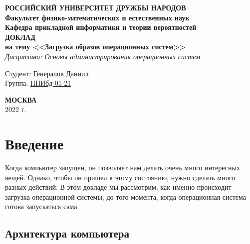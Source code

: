 \documentclass[a4page]{article}
\begin{document}
 
 
\begin{titlepage}

\begin{center}
\hfill \break
\textbf{
\large{РОССИЙСКИЙ УНИВЕРСИТЕТ ДРУЖБЫ НАРОДОВ}\\
\normalsize{Факультет физико-математических и естественных наук}\\ 
\normalsize{Кафедра прикладной информатики и теории вероятностей}\\
}
\vspace*{\fill}
\Large{\textbf{ДОКЛАД\\ на тему <<Загрузка образов операционных систем>>}}
\\
\underline{\textit{\normalsize{Дисциплина: Основы администрирования операционных систем}}}
\vspace*{\fill}

\end{center}
 
 \begin{flushright}
 Студент: \underline{Генералов Даниил}\\ \vspace{0.5cm}
 Группа: \underline{НПИбд-01-21}
 \end{flushright}
 
 
\begin{center} \textbf{МОСКВА} \\ 2022 г. \end{center}
\thispagestyle{empty} %
 
\end{titlepage}

\newpage

\tableofcontents

\newcommand{\code}[1]{\texttt{#1}}

\section{Введение}

Когда компьютер запущен, он позволяет нам делать очень много интересных вещей.
Однако, чтобы он пришел к этому состоянию, нужно сделать много разных действий.
В этом докладе мы рассмотрим, как именно происходит загрузка операционной системы,
до того момента, когда операционная система готова запускаться сама.

\subsection{Архитектура компьютера}
\end{document}
